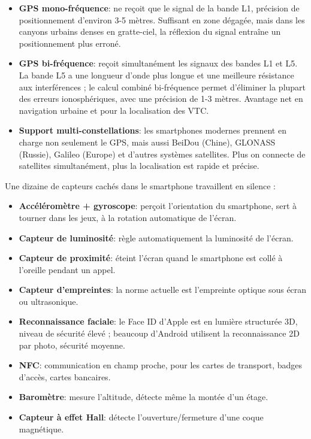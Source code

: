 \begin{itemize}
  \item \textbf{GPS mono-fréquence}: ne reçoit que le signal de la bande L1, précision de positionnement d'environ 3-5 mètres. Suffisant en zone dégagée, mais dans les canyons urbains denses en gratte-ciel, la réflexion du signal entraîne un positionnement plus erroné.
  \item \textbf{GPS bi-fréquence}: reçoit simultanément les signaux des bandes L1 et L5. La bande L5 a une longueur d'onde plus longue et une meilleure résistance aux interférences ; le calcul combiné bi-fréquence permet d'éliminer la plupart des erreurs ionosphériques, avec une précision de 1-3 mètres. Avantage net en navigation urbaine et pour la localisation des VTC.
  \item \textbf{Support multi-constellations}: les smartphones modernes prennent en charge non seulement le GPS, mais aussi BeiDou (Chine), GLONASS (Russie), Galileo (Europe) et d'autres systèmes satellites. Plus on connecte de satellites simultanément, plus la localisation est rapide et précise.
\end{itemize}


Une dizaine de capteurs cachés dans le smartphone travaillent en silence :

\begin{itemize}
  \item \textbf{Accéléromètre + gyroscope}: perçoit l'orientation du smartphone, sert à tourner dans les jeux, à la rotation automatique de l'écran.
  \item \textbf{Capteur de luminosité}: règle automatiquement la luminosité de l'écran.
  \item \textbf{Capteur de proximité}: éteint l'écran quand le smartphone est collé à l'oreille pendant un appel.
  \item \textbf{Capteur d'empreintes}: la norme actuelle est l'empreinte optique sous écran ou ultrasonique.
  \item \textbf{Reconnaissance faciale}: le Face ID d'Apple est en lumière structurée 3D, niveau de sécurité élevé ; beaucoup d'Android utilisent la reconnaissance 2D par photo, sécurité moyenne.
  \item \textbf{NFC}: communication en champ proche, pour les cartes de transport, badges d'accès, cartes bancaires.
  \item \textbf{Baromètre}: mesure l'altitude, détecte même la montée d'un étage.
  \item \textbf{Capteur à effet Hall}: détecte l'ouverture/fermeture d'une coque magnétique.
\end{itemize}

